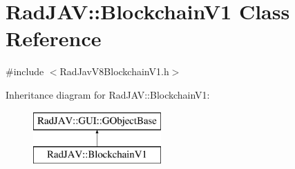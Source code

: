 \hypertarget{class_rad_j_a_v_1_1_blockchain_v1}{}\section{Rad\+J\+AV\+:\+:Blockchain\+V1 Class Reference}
\label{class_rad_j_a_v_1_1_blockchain_v1}


{\ttfamily \#include $<$Rad\+Jav\+V8\+Blockchain\+V1.\+h$>$}

Inheritance diagram for Rad\+J\+AV\+:\+:Blockchain\+V1\+:\begin{figure}[H]
\begin{center}
\leavevmode
\includegraphics[height=2.000000cm]{class_rad_j_a_v_1_1_blockchain_v1}
\end{center}
\end{figure}
